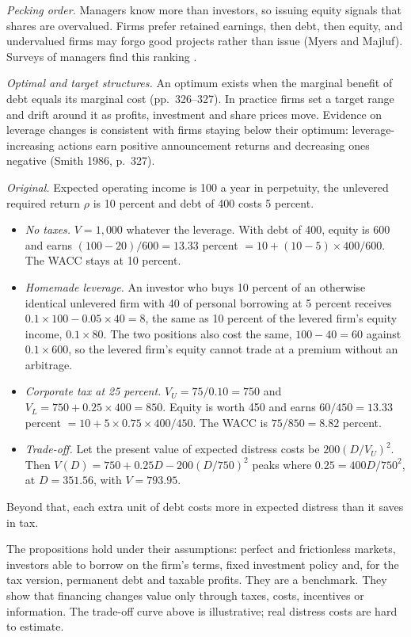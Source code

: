\begin{qfmodel}
\emph{Pecking order.} Managers know more than investors, so issuing equity signals that shares are overvalued. Firms prefer retained earnings, then debt, then equity, and undervalued firms may forgo good projects rather than issue (Myers and Majluf). Surveys of managers find this ranking \citep[pp.~329--331]{applied-corporate-finance-2014}.

\emph{Optimal and target structures.} An optimum exists when the marginal benefit of debt equals its marginal cost (pp.~326--327). In practice firms set a target range and drift around it as profits, investment and share prices move. Evidence on leverage changes is consistent with firms staying below their optimum: leverage-increasing actions earn positive announcement returns and decreasing ones negative (Smith 1986, p.~327).

 \emph{Original.} Expected operating income is 100 a year in perpetuity, the unlevered required return $\rho$ is 10 percent and debt of 400 costs 5 percent.
\begin{itemize}
\item \emph{No taxes.} $V=1{,}000$ whatever the leverage. With debt of 400, equity is 600 and earns $(100-20)/600=13.33$ percent $=10+(10-5)\times400/600$. The WACC stays at 10 percent.
\item \emph{Homemade leverage.} An investor who buys 10 percent of an otherwise identical unlevered firm with 40 of personal borrowing at 5 percent receives $0.1\times100-0.05\times40=8$, the same as 10 percent of the levered firm's equity income, $0.1\times80$. The two positions also cost the same, $100-40=60$ against $0.1\times600$, so the levered firm's equity cannot trade at a premium without an arbitrage.
\item \emph{Corporate tax at 25 percent.} $V_U=75/0.10=750$ and $V_L=750+0.25\times400=850$. Equity is worth 450 and earns $60/450=13.33$ percent $=10+5\times0.75\times400/450$. The WACC is $75/850=8.82$ percent.
\item \emph{Trade-off.} Let the present value of expected distress costs be $200(D/V_U)^2$. Then $V(D)=750+0.25D-200(D/750)^2$ peaks where $0.25=400D/750^2$, at $D=351.56$, with $V=793.95$.
\end{itemize}
Beyond that, each extra unit of debt costs more in expected distress than it saves in tax.

 The propositions hold under their assumptions: perfect and frictionless markets, investors able to borrow on the firm's terms, fixed investment policy and, for the tax version, permanent debt and taxable profits. They are a benchmark. They show that financing changes value only through taxes, costs, incentives or information. The trade-off curve above is illustrative; real distress costs are hard to estimate.


\end{qfmodel}
